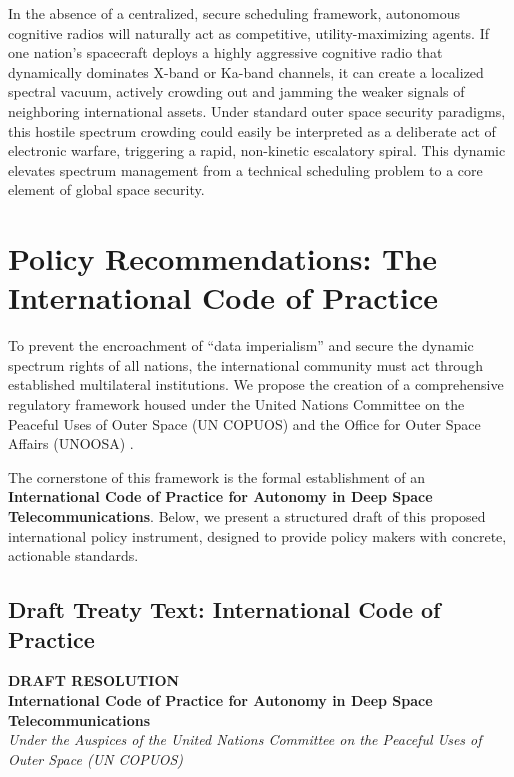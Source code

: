 \documentclass[final,5p,times,twocolumn]{elsarticle}
\begin{document}
In the absence of a centralized, secure scheduling framework, autonomous cognitive radios will naturally act as competitive, utility-maximizing agents. If one nation's spacecraft deploys a highly aggressive cognitive radio that dynamically dominates X-band or Ka-band channels, it can create a localized spectral vacuum, actively crowding out and jamming the weaker signals of neighboring international assets. Under standard outer space security paradigms, this hostile spectrum crowding could easily be interpreted as a deliberate act of electronic warfare, triggering a rapid, non-kinetic escalatory spiral. This dynamic elevates spectrum management from a technical scheduling problem to a core element of global space security.

\section{Policy Recommendations: The International Code of Practice}
\label{sec:recommendations}

To prevent the encroachment of ``data imperialism'' and secure the dynamic spectrum rights of all nations, the international community must act through established multilateral institutions. We propose the creation of a comprehensive regulatory framework housed under the United Nations Committee on the Peaceful Uses of Outer Space (UN COPUOS) and the Office for Outer Space Affairs (UNOOSA) \citep{copuos2019lts}.

The cornerstone of this framework is the formal establishment of an \textbf{International Code of Practice for Autonomy in Deep Space Telecommunications}. Below, we present a structured draft of this proposed international policy instrument, designed to provide policy makers with concrete, actionable standards.

\subsection{Draft Treaty Text: International Code of Practice}

\begin{center}
\textbf{DRAFT RESOLUTION} \\
\textbf{International Code of Practice for Autonomy in Deep Space Telecommunications} \\
\textit{Under the Auspices of the United Nations Committee on the Peaceful Uses of Outer Space (UN COPUOS)}
\end{center}
\end{document}
